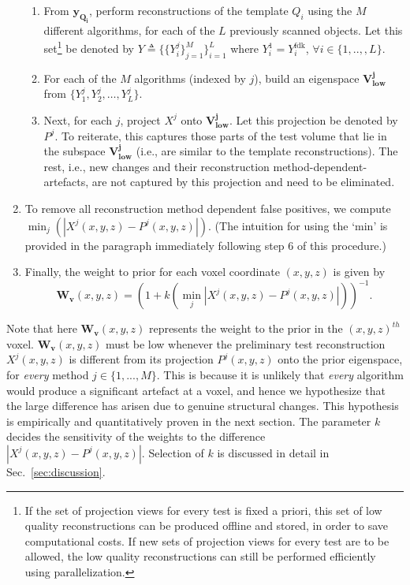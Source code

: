 \documentclass[journal]{IEEEtran}
\begin{document}
\begin{enumerate}
\begin{enumerate}
  \item From $\boldsymbol{y_{Q_i}}$, perform reconstructions of the
    template $Q_i$ using the $M$ different algorithms, for each of the
    $L$ previously scanned objects. Let this set\footnote{If the set of projection views for every test is fixed a priori, this set of low quality reconstructions can be produced offline and stored, in order to save computational costs. If new sets of projection views for every test are to be allowed, the low quality reconstructions can still be performed efficiently using parallelization.} be denoted by $Y
    \triangleq \{\{Y_{i}^j\}_{j=1}^M\}_{i=1}^L$ where $Y^{1}_i =
    Y^{\text{fdk}}_i$, $\forall i \in \{1,..,,L\}$. 


  \item For each of the $M$ algorithms (indexed by $j$), build an
    eigenspace $\boldsymbol{V_\text{low}^j}$ from $\{Y_1^j,Y_2^j,
    \ldots, Y_{L}^j\}$. %

  \item Next, for each $j$, project $X^j$ onto
    $\boldsymbol{V_\text{low}^j}$. Let this projection be denoted by
    $P^j$. To reiterate, this captures those parts of the test volume
    that lie in the subspace $\boldsymbol{V_\text{low}^j}$ (i.e., are
    similar to the template reconstructions). The rest, i.e., new
    changes and their reconstruction method-dependent-artefacts, are
    not captured by this projection and need to be eliminated.
  \end{enumerate}
\item To remove all reconstruction method dependent false positives,
  we compute $\min_{j}(|X^j(x,y,z) - P^j(x,y,z)|)$. (The intuition for
  using the `min' is provided in the paragraph immediately following
  step 6 of this procedure.)
\item Finally, the weight to prior for each voxel coordinate $(x,y,z)$
  is given by
  \begin{equation} 
    \boldsymbol{W_v}(x,y,z) = (1+k(\min_{j}|X^j(x,y,z) - P^j(x,y,z)|))^{-1}.
    \label{eq:weightsEq}
  \end{equation}
\end{enumerate}
\vspace{0.01mm} Note that here $\boldsymbol{W_v}(x,y,z)$ represents
the weight to the prior in the $(x,y,z)^{th}$
voxel. $\boldsymbol{W_v}(x,y,z)$ must be low whenever the preliminary
test reconstruction $X^j(x,y,z)$ is different from its projection
$P^j(x,y,z)$ onto the prior eigenspace, for \emph{every} method $j \in
\{1,...,M\}$. This is because it is unlikely that \emph{every}
algorithm would produce a significant artefact at a voxel, and hence
we hypothesize that the large difference has arisen due to genuine
structural changes. This hypothesis is empirically and quantitatively
proven in the next section.  The parameter $k$ decides the sensitivity
of the weights to the difference $|X^j(x,y,z) - P^j(x,y,z)|$.
Selection of $k$ is discussed in detail in Sec.~\ref{sec:discussion}.\\
\end{document}
